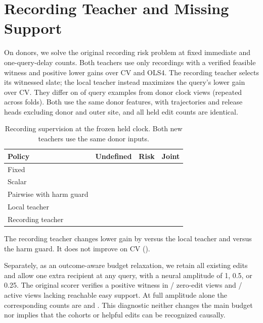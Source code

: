 \section{Recording Teacher and Missing Support}

On donors, we solve the original recording risk problem
at fixed immediate and one-query-delay counts. Both
teachers use only recordings with a verified feasible
witness and positive lower gains over CV and OLS4.
The recording teacher selects its witnessed slate;
the local teacher instead maximizes the query's lower
gain over CV. They differ on \RecordingTeacherDisagrees{}
of \RecordingTeacherChoices{} query examples from
\RecordingTeacherDonorQualified{} donor clock views
(repeated across folds). Both use the same donor features,
with trajectories and release heads excluding donor and
outer site, and all held edit counts are identical.

\begin{table}[h]
\centering
\caption{Recording supervision at the frozen held clock.
Both new teachers use the same donor inputs.}
\small
\begin{tabular}{lrrr}
\toprule
Policy & Undefined & Risk & Joint \\
\midrule
Fixed & \RecordingTeacherFixedUndefined{} & \RecordingTeacherFixedRisk{} & \RecordingTeacherFixedJoint{} \\
Scalar & \RecordingTeacherScalarUndefined{} & \RecordingTeacherScalarRisk{} & \RecordingTeacherScalarJoint{} \\
Pairwise with harm guard & \RecordingTeacherGuardedUndefined{} & \RecordingTeacherGuardedRisk{} & \RecordingTeacherGuardedJoint{} \\
Local teacher & \RecordingTeacherLocalUndefined{} & \RecordingTeacherLocalRisk{} & \RecordingTeacherLocalJoint{} \\
Recording teacher & \RecordingTeacherRecordUndefined{} & \RecordingTeacherRecordRisk{} & \RecordingTeacherRecordJoint{} \\
\bottomrule
\end{tabular}
\end{table}

The recording teacher changes lower gain by
\RecordingTeacherDirect{} versus the local teacher and
\RecordingTeacherGuard{} versus the harm guard. It does
not improve on CV (\RecordingTeacherCV{}).

Separately, as an outcome-aware budget relaxation, we retain
all existing edits and allow one extra recipient at any query,
with a neural amplitude of 1, 0.5, or 0.25. The original
scorer verifies a positive witness in
\RecordingTeacherZeroQualified{}/\RecordingTeacherZeroTotal{}
zero-edit views and
\RecordingTeacherNoEasyQualified{}/\RecordingTeacherNoEasyTotal{}
active views lacking reachable easy support. At full
amplitude alone the corresponding counts are
\RecordingTeacherZeroFull{} and \RecordingTeacherNoEasyFull{}.
This diagnostic neither changes the main budget nor implies
that the cohorts or helpful edits can be recognized causally.
